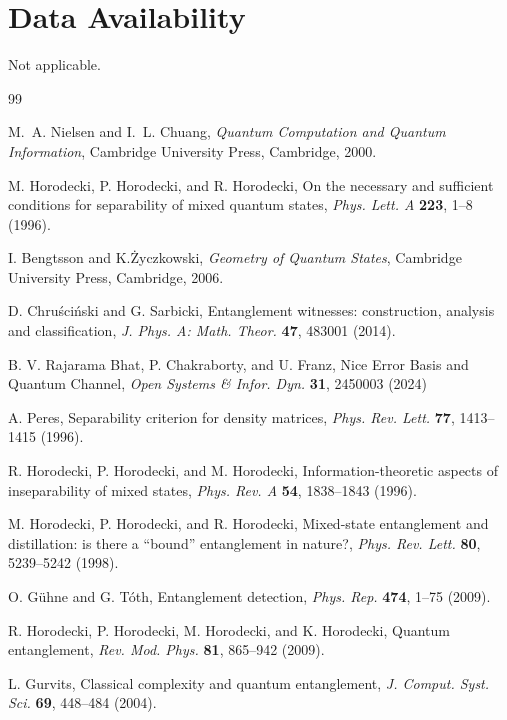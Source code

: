 \documentclass[11pt,reqno]{amsart}
\theoremstyle{definition}
\numberwithin{equation}{section} \setcounter{tocdepth}{1}
\numberwithin{equation}{section}
\begin{document}
\section*{Data Availability} Not applicable.


\begin{thebibliography}{99}

M.~A. Nielsen and I.~L. Chuang, \emph{Quantum Computation and Quantum Information},
Cambridge University Press, Cambridge, 2000.

M. Horodecki, P. Horodecki, and R. Horodecki,
On the necessary and sufficient conditions for separability of mixed quantum states,
\emph{Phys. Lett. A} \textbf{223}, 1–8 (1996).

I. Bengtsson and K.\.Zyczkowski,
\emph{Geometry of Quantum States},
Cambridge University Press, Cambridge, 2006.

D. Chru\'sci\'nski and G. Sarbicki,
Entanglement witnesses: construction, analysis and classification,
\emph{J. Phys. A: Math. Theor.} \textbf{47}, 483001 (2014).

 B. V. Rajarama Bhat, P. Chakraborty, and U. Franz, Nice Error Basis and Quantum Channel,
\emph{Open Systems \& Infor. Dyn.} {\bf 31}, 2450003 (2024)

A. Peres,
Separability criterion for density matrices,
\emph{Phys. Rev. Lett.} \textbf{77}, 1413–1415 (1996).

R. Horodecki, P. Horodecki, and M. Horodecki,
Information-theoretic aspects of inseparability of mixed states,
\emph{Phys. Rev. A} \textbf{54}, 1838–1843 (1996).

M. Horodecki, P. Horodecki, and R. Horodecki,
Mixed-state entanglement and distillation: is there a ``bound'' entanglement in nature?,
\emph{Phys. Rev. Lett.} \textbf{80}, 5239–5242 (1998).

O. G\"uhne and G. T\'oth,
Entanglement detection,
\emph{Phys. Rep.} \textbf{474}, 1–75 (2009).

R. Horodecki, P. Horodecki, M. Horodecki, and K. Horodecki,
Quantum entanglement,
\emph{Rev. Mod. Phys.} \textbf{81}, 865–942 (2009).

L. Gurvits,
Classical complexity and quantum entanglement,
\emph{J. Comput. Syst. Sci.} \textbf{69}, 448–484 (2004).


\end{thebibliography}
\end{document}
